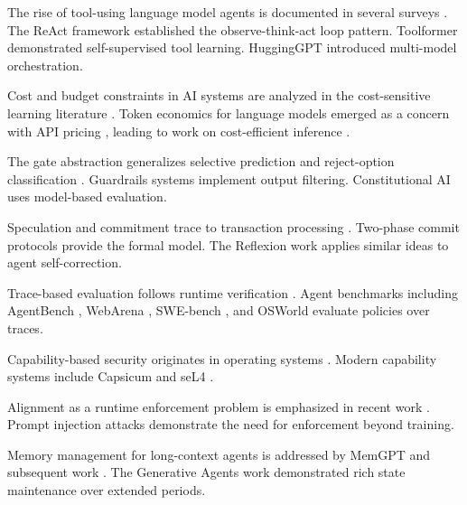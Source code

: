 \documentclass[11pt]{book}
\begin{document}
The rise of tool-using language model agents is documented in several surveys \cite{wang2024survey, xi2023rise, sumers2024cognitive}. The ReAct framework \cite{yao2022react} established the observe-think-act loop pattern. Toolformer \cite{schick2023toolformer} demonstrated self-supervised tool learning. HuggingGPT \cite{shen2023hugginggpt} introduced multi-model orchestration.

Cost and budget constraints in AI systems are analyzed in the cost-sensitive learning literature \cite{turney2000types, elkan2001foundations}. Token economics for language models emerged as a concern with API pricing \cite{chen2023frugalgpt}, leading to work on cost-efficient inference \cite{yue2024largelanguagemodel}.

The gate abstraction generalizes selective prediction \cite{geifman2017selective, elyaniv2010foundations} and reject-option classification \cite{chow1970optimum, bartlett2008classification}. Guardrails systems \cite{rebedea2023nemo, inan2023llama} implement output filtering. Constitutional AI \cite{bai2022constitutional} uses model-based evaluation.

Speculation and commitment trace to transaction processing \cite{gray1992transaction}. Two-phase commit protocols \cite{gray1978notes} provide the formal model. The Reflexion work \cite{shinn2023reflexion} applies similar ideas to agent self-correction.

Trace-based evaluation follows runtime verification \cite{leucker2009brief, havelund2018introduction}. Agent benchmarks including AgentBench \cite{liu2023agentbench}, WebArena \cite{zhou2024webarena}, SWE-bench \cite{jimenez2024swebench}, and OSWorld \cite{xie2024osworld} evaluate policies over traces.

Capability-based security originates in operating systems \cite{dennis1966programming, levy1984capability, saltzer1975protection}. Modern capability systems include Capsicum \cite{watson2010capsicum} and seL4 \cite{klein2009sel4}.

Alignment as a runtime enforcement problem is emphasized in recent work \cite{perez2022red, ganguli2022red, wei2024jailbroken}. Prompt injection attacks \cite{perez2022ignore, greshake2023youve, zhan2024injecagent} demonstrate the need for enforcement beyond training.

Memory management for long-context agents is addressed by MemGPT \cite{packer2023memgpt} and subsequent work \cite{zhang2024survey}. The Generative Agents work \cite{park2023generative} demonstrated rich state maintenance over extended periods.
\end{document}
